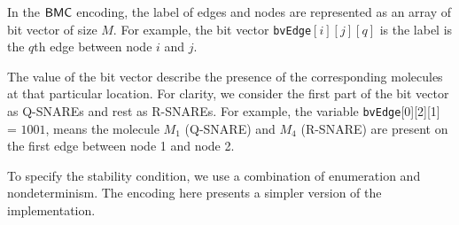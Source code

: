 In the $\mathsf{BMC}$ encoding, the label of edges and nodes are represented as an array of bit vector of size $M$. 
%
For example, the bit vector \texttt{bvEdge}$[i][j][q]$ is the label is the $q$th edge between node $i$ and $j$.

%
%
%
%
%
% 
%
%
%
%
%
%
%
%
%
The value of the bit vector describe the presence of the corresponding molecules at that particular location. 
%
For clarity, we consider the first part of the bit vector as Q-SNAREs and rest as R-SNAREs.
%
For example, the variable \texttt{bvEdge}[0][2][1] = $1001$, means the molecule  $M_{1}$ (Q-SNARE) and $M_{4}$ (R-SNARE) are present on the first edge between node 1 and node 2.

To specify the stability condition, we use a combination of enumeration and nondeterminism.
%
The encoding here presents a simpler version of the implementation. 
%
%

